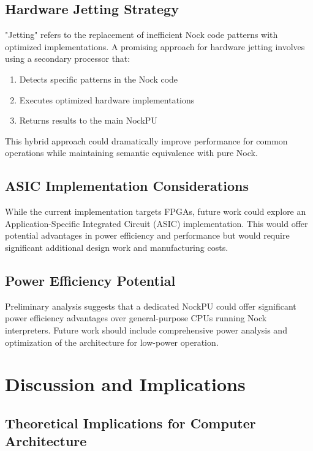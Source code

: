 \documentclass[twoside]{article}
\begin{document}
\subsection{Hardware Jetting Strategy}

"Jetting" refers to the replacement of inefficient Nock code patterns with optimized implementations. A promising approach for hardware jetting involves using a secondary processor that:

\begin{enumerate}
  \item Detects specific patterns in the Nock code
  \item Executes optimized hardware implementations
  \item Returns results to the main NockPU
\end{enumerate}

\noindent
This hybrid approach could dramatically improve performance for common operations while maintaining semantic equivalence with pure Nock.

\subsection{ASIC Implementation Considerations}

While the current implementation targets FPGAs, future work could explore an Application-Specific Integrated Circuit (ASIC) implementation. This would offer potential advantages in power efficiency and performance but would require significant additional design work and manufacturing costs.

\subsection{Power Efficiency Potential}

Preliminary analysis suggests that a dedicated NockPU could offer significant power efficiency advantages over general-purpose CPUs running Nock interpreters. Future work should include comprehensive power analysis and optimization of the architecture for low-power operation.

\section{Discussion and Implications}

\subsection{Theoretical Implications for Computer Architecture}
\end{document}
